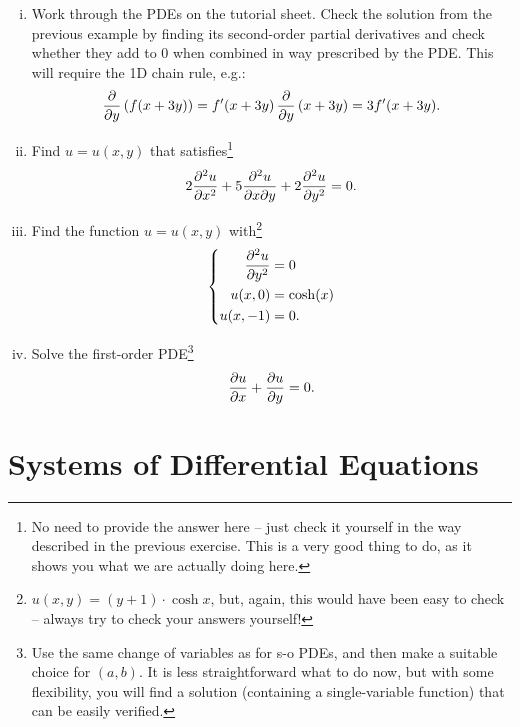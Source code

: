 \begin{exercise}
\begin{enumerate}[(i)]
	\item Work through the PDEs on the tutorial sheet. Check the solution from the previous example by finding its second-order partial derivatives and check whether they add to $0$ when combined in way prescribed by the PDE. This will require the 1D chain rule, e.g.:
	\[ \displaystyle{\frac{\partial }{\partial y}}\left( f(x+3y) \right) = f'(x+3y)\,\displaystyle{\frac{\partial }{\partial y}}\left( x+3y \right)
		= 3f'(x+3y).\]
	\item Find $u=u(x,y)$ that satisfies\footnote{No need to provide the answer here -- just check it yourself in the way described in the previous exercise. This is a very good thing to do, as it shows you what we are actually doing here.}
		\[ 2\displaystyle{\frac{\partial^2 u}{\partial x^2}} + 5\displaystyle{\frac{\partial^2 u}{\partial{x}\partial{y}}} +2\displaystyle{\frac{\partial^2 u}{\partial y^2}} = 0. \]
	\item Find the function $u=u(x,y)$ with\footnote{$u(x,y) = (y+1) \cdot \cosh x$, but, again, this would have been easy to check -- always try to check your answers yourself!}
	\[ \left\{ \begin{split}
\displaystyle{\frac{\partial^2 u}{\partial y^2}} & = 0 \\ u(x,0) &= \cosh(x) \\ u(x,-1) &= 0. 
	\end{split} \right. \]
	\item Solve the first-order PDE\footnote{Use the same change of variables as for s-o PDEs, and then make a suitable choice for $(a,b)$. It is less straightforward what to do now, but with some flexibility, you will find a solution (containing a single-variable function) that can be easily verified.}
	\[ \displaystyle{\frac{\partial u}{\partial x}} + \displaystyle{\frac{\partial u}{\partial y}} = 0. \]
\end{enumerate}
\end{exercise}


\section{Systems of Differential Equations}


